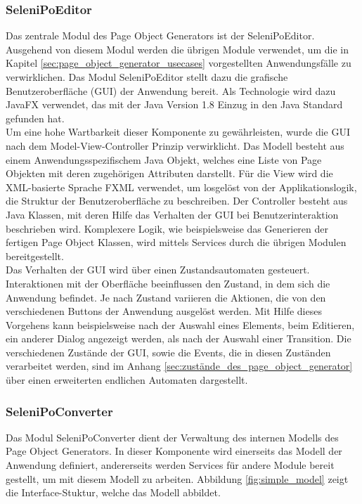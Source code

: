 \subsubsection{SeleniPoEditor}
\label{sec:selenipoeditor}

Das zentrale Modul des Page Object Generators ist der SeleniPoEditor.
Ausgehend von diesem Modul werden die übrigen Module verwendet, um die in Kapitel \ref{sec:page_object_generator_usecases} vorgestellten Anwendungsfälle zu verwirklichen.
Das Modul SeleniPoEditor stellt dazu die grafische Benutzeroberfläche (GUI) der Anwendung bereit.
Als Technologie wird dazu JavaFX \cite{oracle_client_2015} verwendet, das mit der Java Version 1.8 Einzug in den Java Standard gefunden hat. \\
Um eine hohe Wartbarkeit dieser Komponente zu gewährleisten, wurde die GUI nach dem Model-View-Controller Prinzip verwirklicht.
Das Modell besteht aus einem Anwendungsspezifischem Java Objekt, welches eine Liste von Page Objekten mit deren zugehörigen Attributen darstellt.
Für die View wird die XML-basierte Sprache FXML verwendet, um losgelöst von der Applikationslogik, die Struktur der Benutzeroberfläche zu beschreiben.
Der Controller besteht aus Java Klassen, mit deren Hilfe das Verhalten der GUI bei Benutzerinteraktion beschrieben wird.
Komplexere Logik, wie beispielsweise das Generieren der fertigen Page Object Klassen, wird mittels Services durch die übrigen Modulen bereitgestellt.\\
Das Verhalten der GUI wird über einen Zustandsautomaten gesteuert.
Interaktionen mit der Oberfläche beeinflussen den Zustand, in dem sich die Anwendung befindet. Je nach Zustand variieren die Aktionen, die von den verschiedenen Buttons der Anwendung ausgelöst werden.
Mit Hilfe dieses Vorgehens kann beispielsweise nach der Auswahl eines Elements, beim Editieren, ein anderer Dialog angezeigt werden, als nach der Auswahl einer Transition.
Die verschiedenen Zustände der GUI, sowie die Events, die in diesen Zuständen verarbeitet werden, sind im Anhang \ref{sec:zustände_des_page_object_generator} über einen erweiterten endlichen Automaten dargestellt.

\subsubsection{SeleniPoConverter}
\label{sec:selenipoconverter}
Das Modul SeleniPoConverter dient der Verwaltung des internen Modells des Page Object Generators. In dieser Komponente wird einerseits das Modell der Anwendung definiert, andererseits werden Services für andere Module bereit gestellt, um mit diesem Modell zu arbeiten.
Abbildung \ref{fig:simple_model} zeigt die Interface-Stuktur, welche das Modell abbildet.

